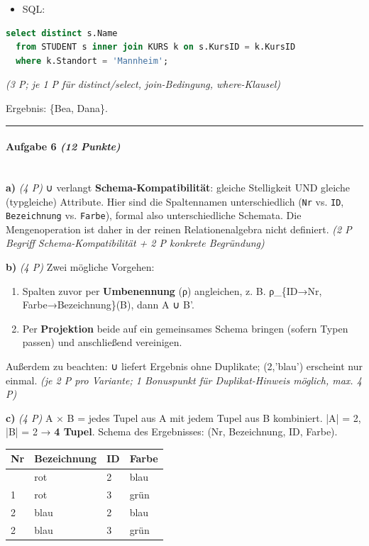 \documentclass[11pt, a4paper]{article}
\begin{document}
\begin{itemize}
  \item SQL:
\end{itemize}
\begin{lstlisting}[language=sql]
  select distinct s.Name
  from STUDENT s inner join KURS k on s.KursID = k.KursID
  where k.Standort = 'Mannheim';
\end{lstlisting}

\textit{(3 P; je 1 P für distinct/select, join-Bedingung, where-Klausel)}


Ergebnis: \{Bea, Dana\}.



\noindent\textcolor{rulegray}{\rule{\linewidth}{0.4pt}}


\paragraph{Aufgabe 6 \textit{(12 Punkte)}}\mbox{}\\[2pt]

\textbf{a)} \textit{(4 P)} ∪ verlangt \textbf{Schema-Kompatibilität}: gleiche Stelligkeit UND gleiche (typgleiche) Attribute. Hier sind die Spaltennamen unterschiedlich (\texttt{Nr} vs. \texttt{ID}, \texttt{Bezeichnung} vs. \texttt{Farbe}), formal also unterschiedliche Schemata. Die Mengenoperation ist daher in der reinen Relationenalgebra nicht definiert. \textit{(2 P Begriff Schema-Kompatibilität + 2 P konkrete Begründung)}


\textbf{b)} \textit{(4 P)} Zwei mögliche Vorgehen:

\begin{enumerate}
  \item Spalten zuvor per \textbf{Umbenennung} (ρ) angleichen, z. B. ρ\_\{ID→Nr, Farbe→Bezeichnung\}(B), dann A ∪ B'.
  \item Per \textbf{Projektion} beide auf ein gemeinsames Schema bringen (sofern Typen passen) und anschließend vereinigen.
\end{enumerate}

Außerdem zu beachten: ∪ liefert Ergebnis ohne Duplikate; (2,'blau') erscheint nur einmal. \textit{(je 2 P pro Variante; 1 Bonuspunkt für Duplikat-Hinweis möglich, max. 4 P)}


\textbf{c)} \textit{(4 P)} A × B = jedes Tupel aus A mit jedem Tupel aus B kombiniert. |A| = 2, |B| = 2 → \textbf{4 Tupel}. Schema des Ergebnisses: (Nr, Bezeichnung, ID, Farbe).



{\small
\begin{tabularx}{\linewidth}{XXXX}
\hline
\rowcolor{tableheadbg}
{\color{white}\textbf{Nr}} & {\color{white}\textbf{Bezeichnung}} & {\color{white}\textbf{ID}} & {\color{white}\textbf{Farbe}} \\[2pt]
\hline
\endhead
\hline
\endfoot
1 & rot & 2 & blau \\
1 & rot & 3 & grün \\
2 & blau & 2 & blau \\
2 & blau & 3 & grün \\
\end{tabularx}
}
\end{document}

